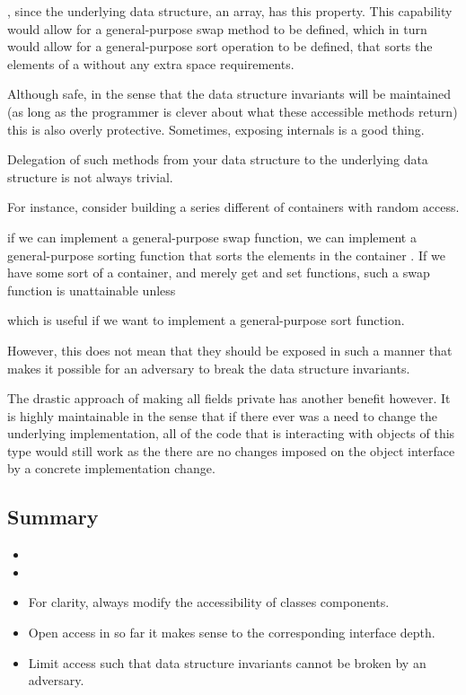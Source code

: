 , since the underlying data structure, an
array, has this property. This capability would allow for a general-purpose
swap method to be defined, which in turn would allow for a general-purpose sort
operation to be defined, that sorts the elements of a 
without any extra space requirements.




Although safe, in the sense that the data structure invariants will be
maintained (as long as the programmer is clever about what these accessible
methods return) this is also overly protective. Sometimes, exposing internals
is a good thing.



Delegation of such methods from your data structure to the underlying data
structure is not always trivial.


For
instance, consider building a series different of containers with random access.


if we can implement a general-purpose swap function, we can implement
a general-purpose sorting function that sorts the elements in the container . If we have some sort of a container, and merely get and set functions, such a swap function is unattainable unless 

 which is useful if we
want to implement a general-purpose sort function.

However, this does not mean that they should be exposed in such a manner that
makes it possible for an adversary to break the data structure invariants.

The drastic approach of making all fields private has another benefit however.
It is highly maintainable in the sense that if there ever was a need to change
the underlying implementation, all of the code that is interacting with objects
of this type would still work as the there are no changes imposed on the object
interface by a concrete implementation change.

\subsection*{Summary}

\begin{itemize}

\item\item

\item For clarity, always modify the accessibility of classes components.

\item Open access in so far it makes sense to the corresponding interface depth.

\item Limit access such that data structure invariants cannot be broken by an
adversary.

\end{itemize}
